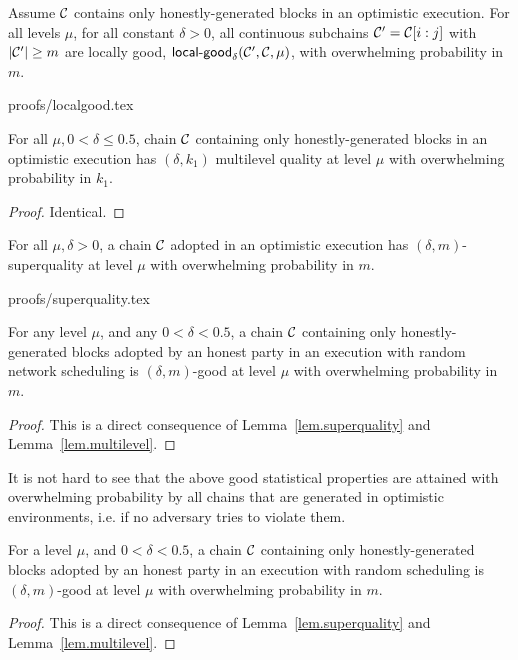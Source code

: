 \begin{lemma}
\label{lem.localgood}
Assume $\mathcal{C}$ contains only honestly-generated blocks in an optimistic
execution. For all levels $\mu$, for all constant $\delta > 0$, all continuous
subchains $\mathcal{C}' = \mathcal{C}[i:j]$ with $|\mathcal{C}'| \geq m$ are locally good,
$\textsf{local-good}_{\delta}(\mathcal{C}', \mathcal{C}, \mu)$, with overwhelming
probability in $m$.
\end{lemma}
{proofs/localgood.tex}

\begin{lemma}\label{lem.multilevel}
For all $\mu, 0 < \delta \leq 0.5$, chain $\mathcal{C}$ containing only
honestly-generated blocks in an optimistic execution has $(\delta, k_1)$
multilevel quality at level $\mu$ with overwhelming probability in $k_1$.
\end{lemma}
\begin{proof}
Identical.
\Qed
\end{proof}

\begin{lemma}[Superquality]
\label{lem.superquality}
For all $\mu, \delta > 0$, a chain $\mathcal{C}$ adopted in an optimistic execution
has $(\delta, m)$-superquality at level $\mu$ with overwhelming probability in
$m$.
\end{lemma}
{proofs/superquality.tex}

\begin{lemma}
\label{lem.superchain-distribution}
For any level $\mu$, and any $0 < \delta < 0.5$, a chain
$\mathcal{C}$ containing only honestly-generated blocks adopted by an honest party in
an execution with random network scheduling is $(\delta, m)$-good at level
$\mu$ with overwhelming probability in $m$.
\end{lemma}
\begin{proof}
This is a direct consequence of Lemma~\ref{lem.superquality} and
Lemma~\ref{lem.multilevel}. \Qed
\end{proof}

It is not hard to see that the above good statistical properties are attained
with overwhelming probability by all chains that are generated in optimistic
environments, i.e. if no adversary tries to violate them.

\begin{lemma}
\label{lem.superchain-distribution}
For a level $\mu$, and $0 < \delta < 0.5$, a chain
$\mathcal{C}$ containing only honestly-generated blocks adopted by an honest party in
an execution with random scheduling is $(\delta, m)$-good at level
$\mu$ with overwhelming probability in $m$.
\end{lemma}
\begin{proof}
This is a direct consequence of Lemma~\ref{lem.superquality} and
Lemma~\ref{lem.multilevel}. \Qed
\end{proof}
